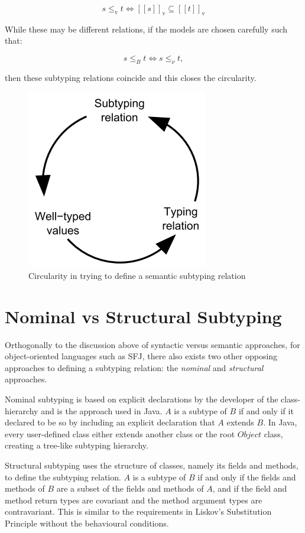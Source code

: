 \documentclass{l4proj}
\begin{document}
\begin{equation}
    s \leq_{\mathrm{v}} t \iff [\![s]\!]_{\mathrm{v}} \subseteq [\![t]\!]_{\mathrm{v}}
\end{equation}

While these may be different relations, if the models are chosen carefully such that:

\begin{equation}
    s \leq_{B} t \iff s \leq_{\nu} t,
\end{equation}

then these subtyping relations coincide and this closes the circularity.

\begin{figure}
    \centering
    \includegraphics[width=0.4\linewidth]{images/circularity.PNG}
    \caption{Circularity in trying to define a semantic subtyping relation \citep{Castagna2005}}
    \label{fig:circ}
\end{figure}

\section{Nominal vs Structural Subtyping}
\label{sec:struct}

Orthogonally to the discussion above of syntactic versus semantic approaches, for object-oriented languages such as SFJ, there also exists two other opposing approaches to defining a subtyping relation: the \emph{nominal} and \emph{structural} approaches.

Nominal subtyping is based on explicit declarations by the developer of the class-hierarchy and is the approach used in Java.
$A$ is a subtype of $B$ if and only if it declared to be so by including an explicit declaration that $A$ extends $B$.
In Java, every user-defined class either extends another class or the root $Object$ class, creating a tree-like subtyping hierarchy.

Structural subtyping uses the structure of classes, namely its fields and methods, to define the subtyping relation.
$A$ is a subtype of $B$ if and only if the fields and methods of $B$ are a subset of the fields and methods of $A$, and if the field and method return types are covariant and the method argument types are contravariant.
This is similar to the requirements in Liskov's Substitution Principle \citep{Liskov1994} without the behavioural conditions.
\end{document}
